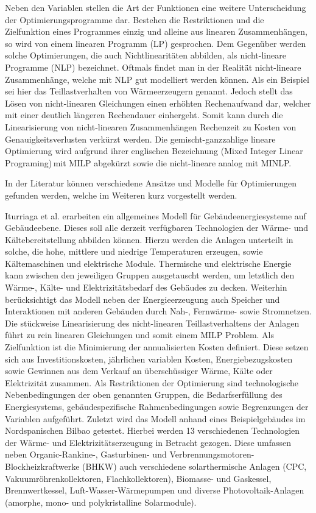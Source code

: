Neben den Variablen stellen die Art der Funktionen eine weitere Unterscheidung der Optimierungsprogramme dar.
Bestehen die Restriktionen und die Zielfunktion eines Programmes einzig und alleine aus linearen Zusammenhängen, so wird von einem linearen Programm (LP) gesprochen.
Dem Gegenüber werden solche Optimierungen, die auch Nichtlinearitäten abbilden, als nicht-lineare Programme (NLP) bezeichnet.
Oftmals findet man in der Realität nicht-lineare Zusammenhänge, welche mit NLP gut modelliert werden können.
Als ein Beispiel sei hier das Teillastverhalten von Wärmeerzeugern genannt.
Jedoch stellt das Lösen von nicht-linearen Gleichungen einen erhöhten Rechenaufwand dar, welcher mit einer deutlich längeren Rechendauer einhergeht.
Somit kann durch die Linearisierung von nicht-linearen Zusammenhängen Rechenzeit zu Kosten von Genauigkeitsverlusten verkürzt werden. 
Die gemischt-ganzzahlige lineare Optimierung wird aufgrund ihrer englischen Bezeichnung (\glqq Mixed Integer Linear Programing\grqq)\,mit MILP abgekürzt sowie die nicht-lineare analog mit MINLP. \cite{Samsatli.2018} %

In der Literatur können verschiedene Ansätze und Modelle für Optimierungen gefunden werden, welche im Weiteren kurz vorgestellt werden.

Iturriaga et al. \cite{Iturriaga.2017} erarbeiten ein allgemeines Modell für Gebäudeenergiesysteme auf Gebäudeebene. 
Dieses soll alle derzeit verfügbaren Technologien der Wärme- und Kältebereitstellung abbilden können.
Hierzu werden die Anlagen unterteilt in solche, die hohe, mittlere und niedrige Temperaturen erzeugen, sowie Kältemaschinen und elektrische Module.
Thermische und elektrische Energie kann zwischen den jeweiligen Gruppen ausgetauscht werden, um letztlich den Wärme-, Kälte- und Elektrizitätsbedarf des Gebäudes zu decken.
Weiterhin berücksichtigt das Modell neben der Energieerzeugung auch Speicher und Interaktionen mit anderen Gebäuden durch Nah-, Fernwärme- sowie Stromnetzen.
Die stückweise Linearisierung des nicht-linearen Teillastverhaltens der Anlagen führt zu rein linearen Gleichungen und somit einem MILP Problem.
Als Zielfunktion ist die Minimierung der annualisierten Kosten definiert. 
Diese setzen sich aus Investitionskosten, jährlichen variablen Kosten, Energiebezugskosten sowie Gewinnen aus dem Verkauf an überschüssiger Wärme, Kälte oder Elektrizität zusammen.
Als Restriktionen der Optimierung sind technologische Nebenbedingungen der oben genannten Gruppen, die Bedarfserfüllung des Energiesystems, gebäudespezifische Rahmenbedingungen sowie Begrenzungen der Variablen aufgeführt.
Zuletzt wird das Modell anhand eines Beispielgebäudes im Nordspanischen Bilbao getestet.
Hierbei werden 13 verschiedenen Technologien der Wärme- und Elektrizitätserzeugung in Betracht gezogen.
Diese umfassen neben Organic-Rankine-, Gasturbinen- und Verbrennungsmotoren-Blockheizkraftwerke (BHKW) auch verschiedene solarthermische Anlagen (CPC, Vakuumröhrenkollektoren, Flachkollektoren), Biomasse- und Gaskessel, Brennwertkessel, Luft-Wasser-Wärmepumpen und diverse Photovoltaik-Anlagen (amorphe, mono- und polykristalline Solarmodule).

